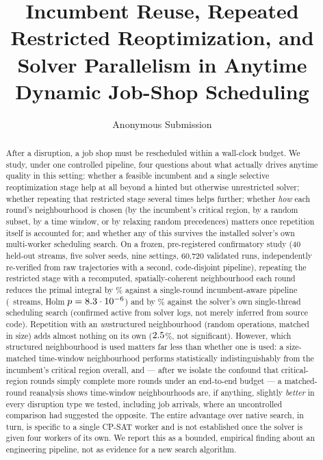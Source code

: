 \documentclass[letterpaper]{article} %
\title{Incumbent Reuse, Repeated Restricted Reoptimization, and Solver Parallelism in Anytime Dynamic Job-Shop Scheduling}
\author{
    Anonymous Submission
}
\begin{document}
\maketitle

\begin{abstract}
After a disruption, a job shop must be rescheduled within a wall-clock budget. We study, under one controlled pipeline, four questions about what actually drives anytime quality in this setting: whether a feasible incumbent and a single selective reoptimization stage help at all beyond a hinted but otherwise unrestricted solver; whether repeating that restricted stage several times helps further; whether \emph{how} each round's neighbourhood is chosen (by the incumbent's critical region, by a random subset, by a time window, or by relaxing random precedences) matters once repetition itself is accounted for; and whether any of this survives the installed solver's own multi-worker scheduling search. On a frozen, pre-registered confirmatory study (40 held-out streams, five solver seeds, nine settings, 60{,}720 validated runs, independently re-verified from raw trajectories with a second, code-disjoint pipeline), repeating the restricted stage with a recomputed, spatially-coherent neighbourhood each round reduces the primal integral by \UOneBTwocritVsBZeroiaipRel\% against a single-round incumbent-aware pipeline (\UOneBTwocritVsBZeroiaipWL\ streams, Holm $p=8.3\cdot10^{-6}$) and by \UOneBTwocritVsBFivenativeOnewRel\% against the solver's own single-thread scheduling search (confirmed active from solver logs, not merely inferred from source code). Repetition with an \emph{un}structured neighbourhood (random operations, matched in size) adds almost nothing on its own ($2.5$\%, not significant). However, which structured neighbourhood is used matters far less than whether one is used: a size-matched time-window neighbourhood performs statistically indistinguishably from the incumbent's critical region overall, and --- after we isolate the confound that critical-region rounds simply complete more rounds under an end-to-end budget --- a matched-round reanalysis shows time-window neighbourhoods are, if anything, slightly \emph{better} in every disruption type we tested, including job arrivals, where an uncontrolled comparison had suggested the opposite. The entire advantage over native search, in turn, is specific to a single CP-SAT worker and is not established once the solver is given four workers of its own. We report this as a bounded, empirical finding about an engineering pipeline, not as evidence for a new search algorithm.
\end{abstract}
\end{document}
